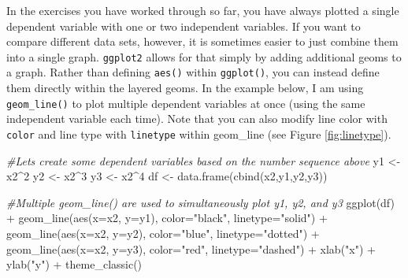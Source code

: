 \documentclass[
]{book}
\newenvironment{Shaded}{\begin{snugshade}}{\end{snugshade}}
\newcommand{\AttributeTok}[1]{\textcolor[rgb]{0.77,0.63,0.00}{#1}}
\newcommand{\CommentTok}[1]{\textcolor[rgb]{0.56,0.35,0.01}{\textit{#1}}}
\newcommand{\DecValTok}[1]{\textcolor[rgb]{0.00,0.00,0.81}{#1}}
\newcommand{\FunctionTok}[1]{\textcolor[rgb]{0.00,0.00,0.00}{#1}}
\newcommand{\NormalTok}[1]{#1}
\newcommand{\OtherTok}[1]{\textcolor[rgb]{0.56,0.35,0.01}{#1}}
\newcommand{\SpecialCharTok}[1]{\textcolor[rgb]{0.00,0.00,0.00}{#1}}
\newcommand{\StringTok}[1]{\textcolor[rgb]{0.31,0.60,0.02}{#1}}
\begin{document}
In the exercises you have worked through so far, you have always plotted a single dependent variable with one or two independent variables. If you want to compare different data sets, however, it is sometimes easier to just combine them into a single graph. \texttt{ggplot2} allows for that simply by adding additional geoms to a graph. Rather than defining \texttt{aes()} within \texttt{ggplot()}, you can instead define them directly within the layered geoms. In the example below, I am using \texttt{geom\_line()} to plot multiple dependent variables at once (using the same independent variable each time). Note that you can also modify line color with \texttt{color} and line type with \texttt{linetype} within geom\_line (see Figure \ref{fig:linetype}).

\begin{Shaded}
\begin{Highlighting}[]
\CommentTok{\#Let\textquotesingle{}s create some dependent variables based on the number sequence above}
\NormalTok{y1 }\OtherTok{\textless{}{-}}\NormalTok{ x2}\SpecialCharTok{\^{}}\DecValTok{2}
\NormalTok{y2 }\OtherTok{\textless{}{-}}\NormalTok{ x2}\SpecialCharTok{\^{}}\DecValTok{3}
\NormalTok{y3 }\OtherTok{\textless{}{-}}\NormalTok{ x2}\SpecialCharTok{\^{}}\DecValTok{4}
\NormalTok{df }\OtherTok{\textless{}{-}} \FunctionTok{data.frame}\NormalTok{(}\FunctionTok{cbind}\NormalTok{(x2,y1,y2,y3))}

\CommentTok{\#Multiple geom\_line() are used to simultaneously plot y1, y2, and y3}
\FunctionTok{ggplot}\NormalTok{(df) }\SpecialCharTok{+}
    \FunctionTok{geom\_line}\NormalTok{(}\FunctionTok{aes}\NormalTok{(}\AttributeTok{x=}\NormalTok{x2, }\AttributeTok{y=}\NormalTok{y1), }\AttributeTok{color=}\StringTok{"black"}\NormalTok{, }\AttributeTok{linetype=}\StringTok{"solid"}\NormalTok{) }\SpecialCharTok{+}
    \FunctionTok{geom\_line}\NormalTok{(}\FunctionTok{aes}\NormalTok{(}\AttributeTok{x=}\NormalTok{x2, }\AttributeTok{y=}\NormalTok{y2), }\AttributeTok{color=}\StringTok{"blue"}\NormalTok{, }\AttributeTok{linetype=}\StringTok{"dotted"}\NormalTok{) }\SpecialCharTok{+}
    \FunctionTok{geom\_line}\NormalTok{(}\FunctionTok{aes}\NormalTok{(}\AttributeTok{x=}\NormalTok{x2, }\AttributeTok{y=}\NormalTok{y3), }\AttributeTok{color=}\StringTok{"red"}\NormalTok{, }\AttributeTok{linetype=}\StringTok{"dashed"}\NormalTok{) }\SpecialCharTok{+}
    \FunctionTok{xlab}\NormalTok{(}\StringTok{"x"}\NormalTok{) }\SpecialCharTok{+}
    \FunctionTok{ylab}\NormalTok{(}\StringTok{"y"}\NormalTok{) }\SpecialCharTok{+}
    \FunctionTok{theme\_classic}\NormalTok{()}
\end{Highlighting}
\end{Shaded}
\end{document}
